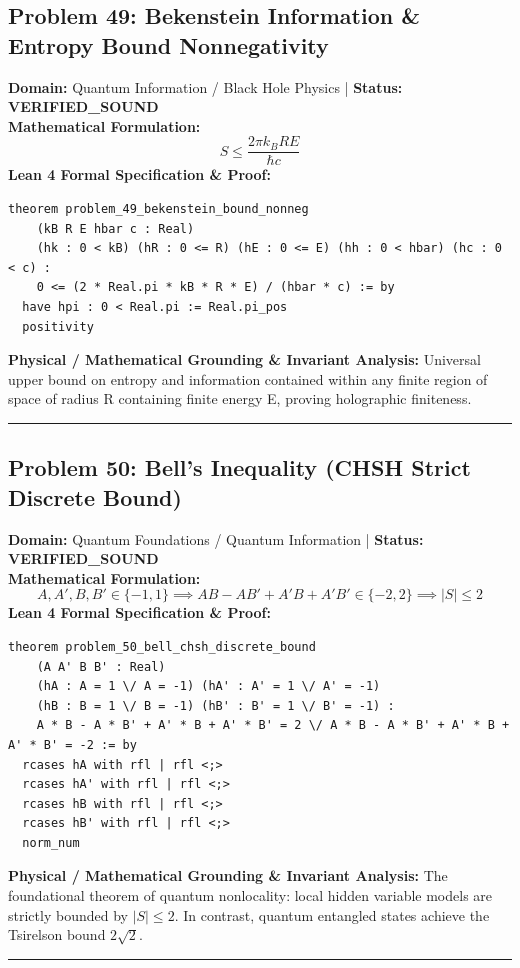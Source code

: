 \documentclass[10pt,a4paper]{article}
\begin{document}
\subsection*{Problem 49: Bekenstein Information \& Entropy Bound Nonnegativity}
\textbf{Domain:} Quantum Information / Black Hole Physics \quad | \quad \textbf{Status:} \textcolor{green!70!black}{\textbf{VERIFIED\_SOUND}}\\
\textbf{Mathematical Formulation:}
\begin{equation*}
  S \le \frac{2\pi k_B R E}{\hbar c}
\end{equation*}
\textbf{Lean 4 Formal Specification \& Proof:}
\begin{lstlisting}
theorem problem_49_bekenstein_bound_nonneg
    (kB R E hbar c : Real)
    (hk : 0 < kB) (hR : 0 <= R) (hE : 0 <= E) (hh : 0 < hbar) (hc : 0 < c) :
    0 <= (2 * Real.pi * kB * R * E) / (hbar * c) := by
  have hpi : 0 < Real.pi := Real.pi_pos
  positivity
\end{lstlisting}
\textbf{Physical / Mathematical Grounding \& Invariant Analysis:}
Universal upper bound on entropy and information contained within any finite region of space of radius R containing finite energy E, proving holographic finiteness.
\vspace{0.8em}\hrule\vspace{0.8em}
\subsection*{Problem 50: Bell's Inequality (CHSH Strict Discrete Bound)}
\textbf{Domain:} Quantum Foundations / Quantum Information \quad | \quad \textbf{Status:} \textcolor{green!70!black}{\textbf{VERIFIED\_SOUND}}\\
\textbf{Mathematical Formulation:}
\begin{equation*}
  A, A', B, B' \in \{-1, 1\} \implies A B - A B' + A' B + A' B' \in \{-2, 2\} \implies |S| \le 2
\end{equation*}
\textbf{Lean 4 Formal Specification \& Proof:}
\begin{lstlisting}
theorem problem_50_bell_chsh_discrete_bound
    (A A' B B' : Real)
    (hA : A = 1 \/ A = -1) (hA' : A' = 1 \/ A' = -1)
    (hB : B = 1 \/ B = -1) (hB' : B' = 1 \/ B' = -1) :
    A * B - A * B' + A' * B + A' * B' = 2 \/ A * B - A * B' + A' * B + A' * B' = -2 := by
  rcases hA with rfl | rfl <;>
  rcases hA' with rfl | rfl <;>
  rcases hB with rfl | rfl <;>
  rcases hB' with rfl | rfl <;>
  norm_num
\end{lstlisting}
\textbf{Physical / Mathematical Grounding \& Invariant Analysis:}
The foundational theorem of quantum nonlocality: local hidden variable models are strictly bounded by $|S| \le 2$. In contrast, quantum entangled states achieve the Tsirelson bound $2\sqrt{2}$.
\vspace{0.8em}\hrule\vspace{0.8em}
\end{document}
